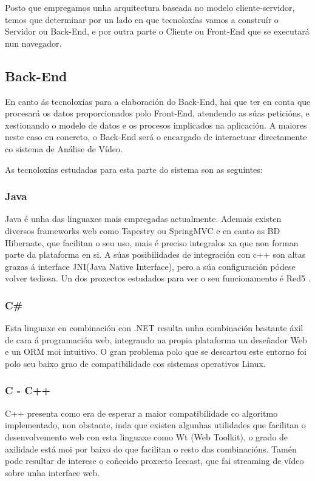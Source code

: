     Posto que empregamos unha arquitectura baseada no modelo cliente-servidor, temos que determinar 
    por un lado en que tecnoloxías vamos a construír o Servidor ou Back-End, e por outra parte o 
    Cliente ou Front-End que se executará nun navegador.  

    \subsection{Back-End}
        En canto ás tecnoloxías para a elaboración do Back-End, hai que ter en conta que procesará
        os datos proporcionados polo Front-End, atendendo as súas peticións, e xestionando o modelo de 
        datos e os procesos implicados na aplicación. A maiores neste caso en concreto, o Back-End será
        o encargado de interactuar directamente co sistema de Análise de Vídeo.
        
        As tecnoloxías estudadas para esta parte do sistema son as seguintes:

        \subsubsection{Java}
        Java é unha das linguaxes mais empregadas actualmente. Ademais existen diversos
        frameworks web como Tapestry ou SpringMVC e en canto as BD Hibernate, que facilitan o 
        seu uso, mais é preciso integralos xa que non forman parte da plataforma en si. A súas 
        posibilidades de integración con c++ son altas grazas á interface JNI(Java Native 
        Interface), pero a súa configuración pódese volver tediosa. Un dos proxectos estudados
        para ver o seu funcionamento é Red5 \cite{red5-github-url}.
        
        \subsubsection{C\#}
        Esta linguaxe en combinación con .NET resulta unha combinación bastante áxil de cara
        á programación web, integrando na propia plataforma un deseñador Web e un ORM moi 
        intuitivo. O gran problema polo que se descartou este entorno foi polo seu baixo grao
        de compatibilidade cos sistemas operativos Linux.
        
        \subsubsection{C - C++}
        C++ presenta como era de esperar a maior compatibilidade co algoritmo implementado, non
        obstante, inda que existen algunhas utilidades que facilitan o desenvolvemento web con 
        esta linguaxe como Wt (Web Toolkit)\cite{wt-url}, o grado de axilidade está moi por 
        baixo do que facilitan o resto das combinacións. Tamén pode resultar de interese o
        coñecido proxecto Icecast\cite{icecast-url}, que fai streaming de vídeo sobre unha 
        interface web.
        
